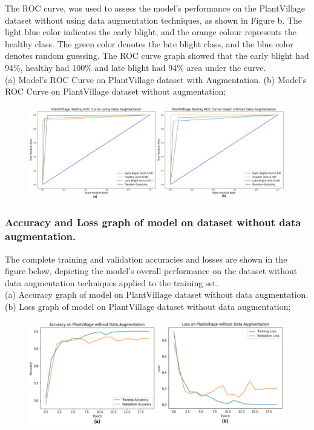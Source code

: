 \documentclass[11pt]{report}
\begin{document}
\newpage
The ROC curve, was used to assess the model’s
performance on the PlantVillage dataset without using data augmentation techniques, as
shown in Figure b. The light blue color indicates the early blight, and the orange colour
represents the healthy class. The green color denotes the late blight class, and the blue
color denotes random guessing. The ROC curve graph showed that the early blight had
94\%, healthy had 100\% and late blight had 94\% area under the curve.\\


(a) Model's ROC Curve on PlantVillage dataset with Augmentation. (b) Model's ROC Curve on PlantVillage dataset without augmentation;\\

\begin{figure}[h]
	\centerline{\small 
		\includegraphics[height=0.17\textheight]  {v5}}
\end{figure}

\subsubsection*{Accuracy and Loss graph of model on dataset without data augmentation.}

The complete training and validation
accuracies and losses are shown in the figure below, depicting the model’s
overall performance on the dataset without data augmentation techniques
applied to the training set.\\

(a) Accuracy graph of model on PlantVillage dataset without data augmentation. (b) Loss
graph of model on PlantVillage dataset without data augmentation;\\

\begin{figure}[h]
	\centerline{\small 
		\includegraphics[height=0.17\textheight]  {v6}}
\end{figure}
\end{document}
